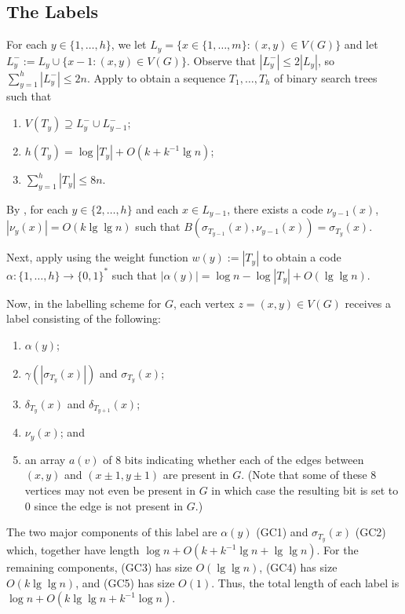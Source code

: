 \documentclass[kpfonts]{patmorin}
\let\le\leqslant
\begin{document}
\subsection{The Labels}

For each $y\in\{1,\ldots,h\}$, we let $L_y=\{x\in\{1,\ldots,m\}:(x,y)\in V(G)\}$ and let $L^-_y:=L_y\cup\{x-1:(x,y)\in V(G)\}$.  Observe that $|L^-_y|\le 2|L_y|$, so $\sum_{y=1}^h |L^-_y|\le 2n$.   Apply  to obtain a sequence $T_1,\ldots,T_h$ of binary search trees such that

\begin{enumerate}[(PR1)]
  \item $V(T_y)\supseteq L^-_{y}\cup L^-_{y-1}$;
  \item $h(T_y)=\log|T_y| + O(k+k^{-1}\lg n)$;
  \item $\sum_{y=1}^h|T_y| \le 8n$.
\end{enumerate}

By , for each $y\in\{2,\ldots,h\}$ and each $x\in L_{y-1}$, there exists a code $\nu_{y-1}(x)$, $|\nu_y(x)|=O(k\lg\lg n)$ such that $B(\sigma_{T_{y-1}}(x),\nu_{y-1}(x))=\sigma_{T_y}(x)$.

Next, apply  using the weight function $w(y):=|T_y|$ to obtain a code $\alpha:\{1,\ldots,h\}\to \{0,1\}^*$ such that $|\alpha(y)|=\log n - \log|T_y| + O(\lg\lg n)$.

Now, in the labelling scheme for $G$, each vertex $z=(x,y)\in V(G)$ receives a label consisting of the following:  
\begin{enumerate}[(GC1)]
  \item $\alpha(y)$;
  \item $\gamma(|\sigma_{T_y}(x)|)$ and $\sigma_{T_y}(x)$;
  \item $\delta_{T_y}(x)$ and $\delta_{T_{y+1}}(x)$;
  \item $\nu_y(x)$; and
  \item an array $a(v)$ of $8$ bits indicating whether each of the edges between $(x,y)$ and $(x\pm 1,y\pm 1)$ are present in $G$.  (Note that some of these 8 vertices may not even be present in $G$ in which case the resulting bit is set to 0 since the edge is not present in $G$.)
\end{enumerate}
The two major components of this label are $\alpha(y)$ (GC1) and $\sigma_{T_y}(x)$ (GC2) which, together have length $\log n + O(k+k^{-1}\lg n+\lg\lg n)$. For the remaining components, (GC3) has size $O(\lg\lg n)$, (GC4) has size $O(k\lg\lg n)$, and (GC5) has size $O(1)$.  Thus, the total length of each label is $\log n+ O(k\lg\lg n + k^{-1}\log n)$.  
\end{document}
